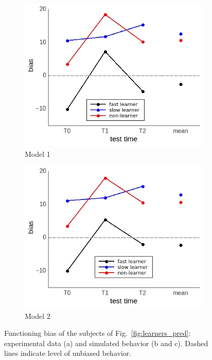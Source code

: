 \documentclass[a4paper]{scrreprt}
\begin{document}
\begin{figure}
        \begin{subfigure}[b]{0.49\textwidth}    
            \includegraphics[width=\textwidth]{figs/sec3/individuals_diff_mod1.jpeg}
        \caption{Model 1}
    \end{subfigure}    
    \begin{subfigure}[b]{0.49\textwidth}
        \includegraphics[width=\textwidth]{figs/sec3/individual_diff_mod2.jpeg}
        \caption{Model 2}
    \end{subfigure}
\caption{Functioning bias of the subjects of Fig.~\ref{fig:learners_pred}: experimental data (a) and simulated behavior (b and c). Dashed lines indicate level of unbiased behavior.}
\label{fig:learners_bias}
\end{figure}
\end{document}
